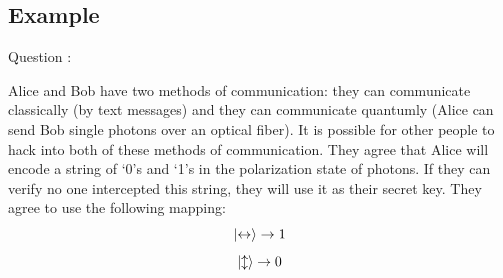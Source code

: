 \documentclass[12pt]{article}
\begin{document}

\subsection{Example}


Question :


\newcommand*{\HH}{\leftrightarrow}
\newcommand*{\VV}{\updownarrow}
\newcommand{\Dzero}{%
  \mathrel{\text{\ooalign{$\swarrow$\cr$\nearrow$}}}%
}
\newcommand{\Done}{%
  \mathrel{\text{\ooalign{$\searrow$\cr$\nwarrow$}}}%
}
\renewcommand{\arraystretch}{1.4}
\newcommand*{\X}{$\times$}
\newcommand*{\G}[1]{\textcolor{Green4}{#1}}
\newcommand*{\R}[1]{\textcolor{Red4}{#1}}

Alice and Bob have two methods of communication: they can communicate classically (by text messages) and they can communicate quantumly (Alice can send Bob single photons over an optical fiber). It is possible for other people to hack into both of these methods of communication. They agree that Alice will encode a string of `0's and `1's in the polarization state of photons. If they can verify no one intercepted this string, they will use it as their secret key. They agree to use the following mapping:
\begin{equation}
    \ket{{\HH}} \rightarrow 1 
\end{equation}
\begin{equation}
    \ket{\VV} \rightarrow 0
\end{equation}
    
\end{document}
